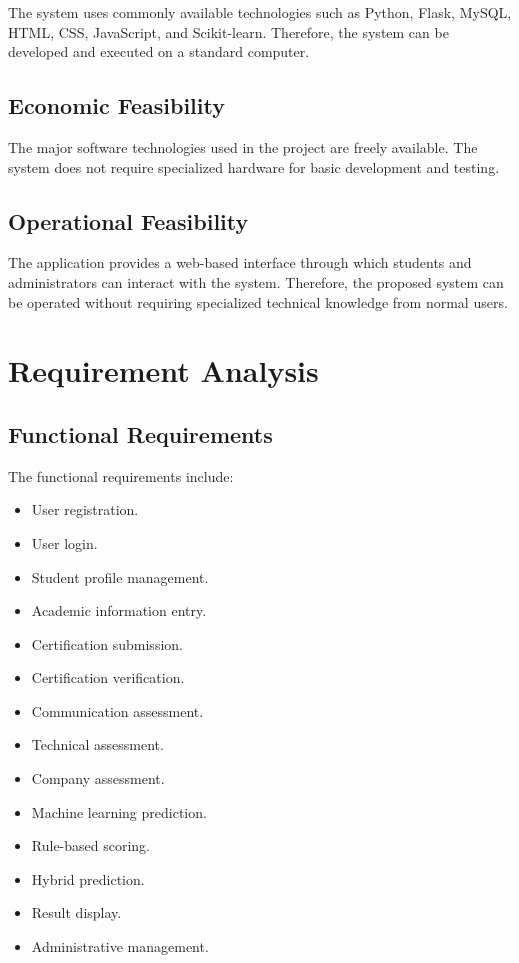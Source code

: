 \documentclass[12pt,a4paper]{report}
\begin{document}
The system uses commonly available technologies such as Python,
Flask, MySQL, HTML, CSS, JavaScript, and Scikit-learn. Therefore,
the system can be developed and executed on a standard computer.

\subsection{Economic Feasibility}

The major software technologies used in the project are freely
available. The system does not require specialized hardware for
basic development and testing.

\subsection{Operational Feasibility}

The application provides a web-based interface through which
students and administrators can interact with the system.
Therefore, the proposed system can be operated without requiring
specialized technical knowledge from normal users.

\section{Requirement Analysis}

\subsection{Functional Requirements}

The functional requirements include:

\begin{itemize}
    \item User registration.
    \item User login.
    \item Student profile management.
    \item Academic information entry.
    \item Certification submission.
    \item Certification verification.
    \item Communication assessment.
    \item Technical assessment.
    \item Company assessment.
    \item Machine learning prediction.
    \item Rule-based scoring.
    \item Hybrid prediction.
    \item Result display.
    \item Administrative management.
\end{itemize}
\end{document}
